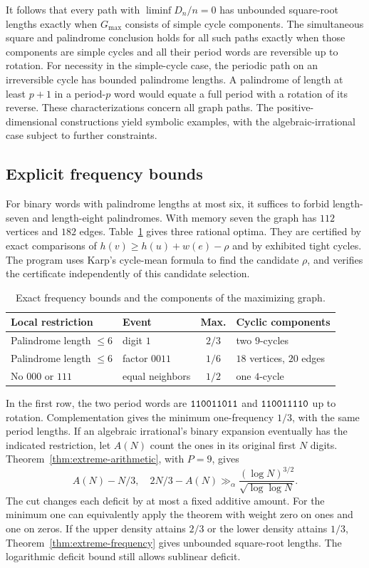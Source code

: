 It follows that every path with \(\liminf D_n/n=0\) has unbounded square-root lengths exactly when \(G_{\max}\) consists of simple cycle components. The simultaneous square and palindrome conclusion holds for all such paths exactly when those components are simple cycles and all their period words are reversible up to rotation. For necessity in the simple-cycle case, the periodic path on an irreversible cycle has bounded palindrome lengths. A palindrome of length at least \(p+1\) in a period-\(p\) word would equate a full period with a rotation of its reverse. These characterizations concern all graph paths. The positive-dimensional constructions yield symbolic examples, with the algebraic-irrational case subject to further constraints.

\subsection{Explicit frequency bounds}

For binary words with palindrome lengths at most six, it suffices to forbid length-seven and length-eight palindromes. With memory seven the graph has \(112\) vertices and \(182\) edges. Table~\ref{tab:frequency-graphs} gives three rational optima. They are certified by exact comparisons of \(h(v)\ge h(u)+w(e)-\rho\) and by exhibited tight cycles. The program uses Karp's cycle-mean formula \cite{Karp} to find the candidate \(\rho\), and verifies the certificate independently of this candidate selection.

\begin{table}[ht]
\centering
\begin{tabular}{@{}llcl@{}}
\toprule
Local restriction & Event & Max. & Cyclic components\\
\midrule
Palindrome length \(\le6\) & digit \(1\) & \(2/3\) & two \(9\)-cycles\\
Palindrome length \(\le6\) & factor \(0011\) & \(1/6\) & \(18\) vertices, \(20\) edges\\
No \(000\) or \(111\) & equal neighbors & \(1/2\) & one \(4\)-cycle\\
\bottomrule
\end{tabular}
\caption{Exact frequency bounds and the components of the maximizing graph.}
\label{tab:frequency-graphs}
\end{table}

In the first row, the two period words are \(\mathtt{110011011}\) and \(\mathtt{110011110}\) up to rotation. Complementation gives the minimum one-frequency \(1/3\), with the same period lengths. If an algebraic irrational's binary expansion eventually has the indicated restriction, let \(A(N)\) count the ones in its original first \(N\) digits. Theorem~\ref{thm:extreme-arithmetic}, with \(P=9\), gives
\[
  A(N)-N/3,\quad 2N/3-A(N)
          \gg_\alpha \frac{(\log N)^{3/2}}{\sqrt{\log\log N}} .
\]
The cut changes each deficit by at most a fixed additive amount. For the minimum one can equivalently apply the theorem with weight zero on ones and one on zeros. If the upper density attains \(2/3\) or the lower density attains \(1/3\), Theorem~\ref{thm:extreme-frequency} gives unbounded square-root lengths. The logarithmic deficit bound still allows sublinear deficit.


